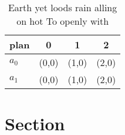 \documentclass[a4paper]{article}
\begin{document}
\begin{table}
\begin{adjustbox}{width=0.6\columnwidth}
\begin{tabular}{|l|l|l|l|}
\hline
\textbf{plan} & \multicolumn{1}{c|}{\textbf{0}} & \multicolumn{1}{c|}{\textbf{1}} & \multicolumn{1}{c|}{\textbf{2}} \\ \hline
\textbf{$a_0$}  & (0,0) & (1,0) & (2,0) \\ \hline
\textbf{$a_1$}  & (0,0) & (1,0) & (2,0) \\ \hline
\end{tabular}
\end{adjustbox}
\caption{Earth yet loods rain alling on hot To openly with
}
\end{table}

\section{Section}
\end{document}
